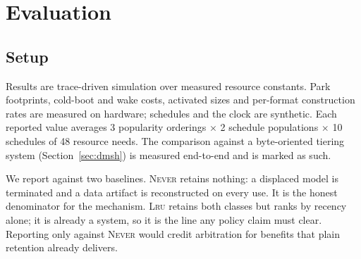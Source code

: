 %
%

\section{Evaluation}

\subsection{Setup}

Results are trace-driven simulation over measured resource constants. Park
footprints, cold-boot and wake costs, activated sizes and per-format
construction rates are measured on hardware; schedules and the clock are
synthetic. Each reported value averages 3 popularity orderings $\times$ 2
schedule populations $\times$ 10 schedules of 48 resource needs. The
comparison against a byte-oriented tiering system
(Section~\ref{sec:dmsh}) is measured end-to-end and is marked as such.

We report against two baselines. \textsc{Never} retains nothing: a displaced
model is terminated and a data artifact is reconstructed on every use. It is
the honest denominator for the mechanism. \textsc{Lru} retains both classes
but ranks by recency alone; it is already a system, so it is the line any
policy claim must clear. Reporting only against \textsc{Never} would credit
arbitration for benefits that plain retention already delivers.

